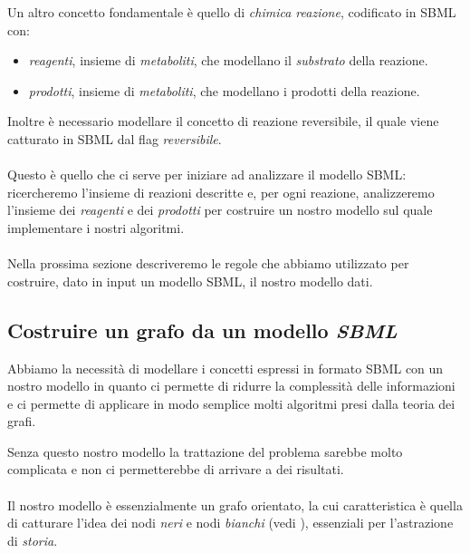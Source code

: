 Un altro concetto fondamentale \`e quello di \emph{chimica reazione},
codificato in SBML con:
\begin{itemize}
\item \emph{reagenti}, insieme di \emph{metaboliti}, che modellano il
  \emph{substrato} della reazione.
\item \emph{prodotti}, insieme di \emph{metaboliti}, che modellano i
  prodotti della reazione.
\end{itemize}
Inoltre \`e necessario modellare il concetto di reazione
reversibile, il quale viene catturato in SBML dal flag
\emph{reversibile}.
\\\\
Questo \`e quello che ci serve per iniziare ad analizzare il modello
SBML: ricercheremo l'insieme di reazioni descritte e, per ogni
reazione, analizzeremo l'insieme dei \emph{reagenti} e dei
\emph{prodotti} per costruire un nostro modello sul quale implementare
i nostri algoritmi.
\\\\
Nella prossima sezione descriveremo le regole che abbiamo utilizzato
per costruire, dato in input un modello SBML, il nostro modello
dati.

\subsection{Costruire un grafo da un modello \emph{SBML}}

Abbiamo la necessit\`a di modellare i concetti espressi in formato
SBML con un nostro modello in quanto ci permette di ridurre la
complessit\`a delle informazioni e ci permette di applicare in modo
semplice molti algoritmi presi dalla teoria dei grafi.

Senza questo nostro modello la trattazione del problema sarebbe molto
complicata e non ci permetterebbe di arrivare a dei risultati.
\\\\
Il nostro modello \`e essenzialmente un grafo orientato, la cui
caratteristica \`e quella di catturare l'idea dei nodi \emph{neri} e
nodi \emph{bianchi} (vedi \cite{tellingStories}), essenziali per
l'astrazione di \emph{storia}.

